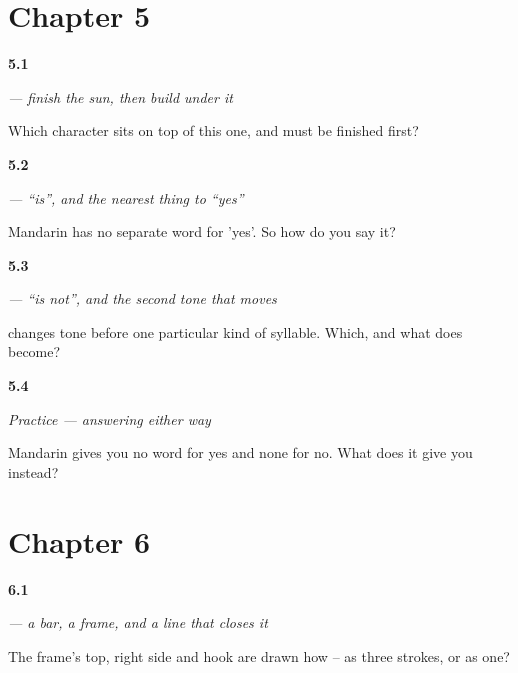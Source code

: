 \section*{Chapter 5}

\noindent\begin{minipage}[t]{\linewidth}
\raggedright
\hypertarget{review-ZH-W05-shi-top}{\textbf{5.1}} \emph{ — finish the sun, then build under it}\par
\small Which character sits on top of this one, and must be finished first?
\end{minipage}\par\medskip

\noindent\begin{minipage}[t]{\linewidth}
\raggedright
\hypertarget{review-ZH-C05-shi-yes}{\textbf{5.2}} \emph{ — \textquotedblleft{}is\textquotedblright{}, and the nearest thing to \textquotedblleft{}yes\textquotedblright{}}\par
\small Mandarin has no separate word for 'yes'. So how do you say it?
\end{minipage}\par\medskip

\noindent\begin{minipage}[t]{\linewidth}
\raggedright
\hypertarget{review-ZH-C05-bushi-sandhi}{\textbf{5.3}} \emph{ — \textquotedblleft{}is not\textquotedblright{}, and the second tone that moves}\par
\small {} changes tone before one particular kind of syllable. Which, and what does  become?
\end{minipage}\par\medskip

\noindent\begin{minipage}[t]{\linewidth}
\raggedright
\hypertarget{review-ZH-C05-practice-pair}{\textbf{5.4}} \emph{Practice — answering either way}\par
\small Mandarin gives you no word for yes and none for no. What does it give you instead?
\end{minipage}\par\medskip

\section*{Chapter 6}

\noindent\begin{minipage}[t]{\linewidth}
\raggedright
\hypertarget{review-ZH-W06-zai-frame}{\textbf{6.1}} \emph{ — a bar, a frame, and a line that closes it}\par
\small The frame's top, right side and hook are drawn how -- as three strokes, or as one?
\end{minipage}\par\medskip

